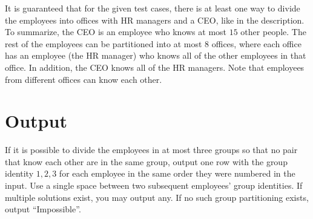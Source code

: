 It is guaranteed that for the given test cases, there is at least one way to divide the employees into offices 
with HR managers and a CEO, like in the description. To summarize, the CEO is an employee who knows at most 
$15$ other people. The rest of the employees can be partitioned into at most $8$ offices, where each office
has an employee (the HR manager) who knows all of the other employees in that office. In addition, the CEO knows all of the HR managers.
Note that employees from different offices can know each other. 

\section*{Output}
If it is possible to divide the employees in at most three groups so that no pair that know each other are in the same group, output one row with the group identity $1,2,3$ for each employee in the same order they were numbered in the input. Use a single space between two subsequent employees' group identities. If multiple solutions exist, you may output any. If no such group partitioning exists, output ``Impossible''.

